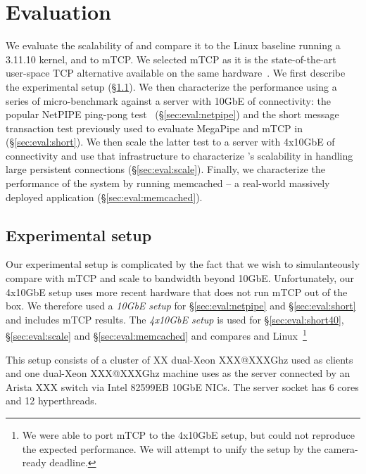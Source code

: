 
\section{Evaluation}
\label{sec:eval}

We evaluate the scalability of \ix and compare it to the Linux
baseline running a 3.11.10 kernel, and to mTCP. We selected mTCP as it
is the state-of-the-art user-space TCP alternative available on the
same hardware~\cite{jeong2014mtcp}.  We first describe the
experimental setup (\S\ref{sec:eval:setup}).  We then characterize the
performance using a series of micro-benchmark against a server with
10GbE of connectivity: the popular NetPIPE ping-pong
test~\cite{snell1996netpipe} (\S\ref{sec:eval:netpipe}) and the short
message transaction test previously used to evaluate MegaPipe and mTCP
in~\cite{han2012megapipe,jeong2014mtcp} (\S\ref{sec:eval:short}).  We
then scale the latter test to a server with 4x10GbE of connectivity
and use that infrastructure to characterize \ix's scalability in
handling large persistent connections (\S\ref{sec:eval:scale}).
Finally, we characterize the performance of the \ix system by running
memcached -- a real-world massively deployed application
(\S\ref{sec:eval:memcached}).


\subsection{Experimental setup}
\label{sec:eval:setup}

Our experimental setup is complicated by the fact that we wish to
simulanteously compare with mTCP and scale to bandwidth beyond 10GbE.
Unfortunately, our 4x10GbE setup uses more recent hardware that does
not run mTCP out of the box.  We therefore used a \emph{10GbE setup}
for \S\ref{sec:eval:netpipe} and \S\ref{sec:eval:short} and includes
mTCP results. The \emph{4x10GbE setup} is used for
\S\ref{sec:eval:short40}, \S\ref{sec:eval:scale} and
\S\ref{sec:eval:memcached} and compares \ix and Linux~\footnote{We
  were able to port mTCP to the 4x10GbE setup, but could not reproduce
  the expected performance.  We will attempt to unify the setup by the
  camera-ready deadline.}


 
  This setup consists of a
cluster of XX dual-Xeon XXX@XXXGhz used as clients and one dual-Xeon
XXX@XXXGhz machine uses as the server connected by an Arista XXX
switch via Intel 82599EB 10GbE NICs.  The server socket has 6 cores and
12 hyperthreads.

